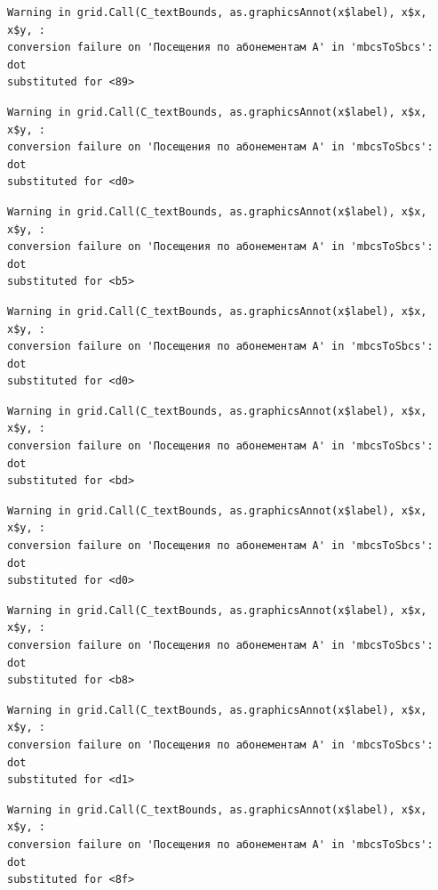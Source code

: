 \documentclass[
  letterpaper,
  DIV=11,
  numbers=noendperiod]{scrartcl}
\begin{document}
\begin{verbatim}
Warning in grid.Call(C_textBounds, as.graphicsAnnot(x$label), x$x, x$y, :
conversion failure on 'Посещения по абонементам А' in 'mbcsToSbcs': dot
substituted for <89>
\end{verbatim}

\begin{verbatim}
Warning in grid.Call(C_textBounds, as.graphicsAnnot(x$label), x$x, x$y, :
conversion failure on 'Посещения по абонементам А' in 'mbcsToSbcs': dot
substituted for <d0>
\end{verbatim}

\begin{verbatim}
Warning in grid.Call(C_textBounds, as.graphicsAnnot(x$label), x$x, x$y, :
conversion failure on 'Посещения по абонементам А' in 'mbcsToSbcs': dot
substituted for <b5>
\end{verbatim}

\begin{verbatim}
Warning in grid.Call(C_textBounds, as.graphicsAnnot(x$label), x$x, x$y, :
conversion failure on 'Посещения по абонементам А' in 'mbcsToSbcs': dot
substituted for <d0>
\end{verbatim}

\begin{verbatim}
Warning in grid.Call(C_textBounds, as.graphicsAnnot(x$label), x$x, x$y, :
conversion failure on 'Посещения по абонементам А' in 'mbcsToSbcs': dot
substituted for <bd>
\end{verbatim}

\begin{verbatim}
Warning in grid.Call(C_textBounds, as.graphicsAnnot(x$label), x$x, x$y, :
conversion failure on 'Посещения по абонементам А' in 'mbcsToSbcs': dot
substituted for <d0>
\end{verbatim}

\begin{verbatim}
Warning in grid.Call(C_textBounds, as.graphicsAnnot(x$label), x$x, x$y, :
conversion failure on 'Посещения по абонементам А' in 'mbcsToSbcs': dot
substituted for <b8>
\end{verbatim}

\begin{verbatim}
Warning in grid.Call(C_textBounds, as.graphicsAnnot(x$label), x$x, x$y, :
conversion failure on 'Посещения по абонементам А' in 'mbcsToSbcs': dot
substituted for <d1>
\end{verbatim}

\begin{verbatim}
Warning in grid.Call(C_textBounds, as.graphicsAnnot(x$label), x$x, x$y, :
conversion failure on 'Посещения по абонементам А' in 'mbcsToSbcs': dot
substituted for <8f>
\end{verbatim}
\end{document}
